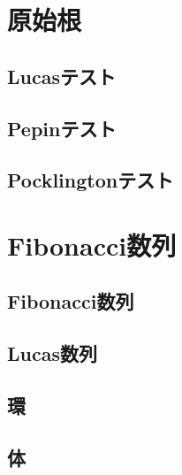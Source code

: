 \section{原始根}
\subsection{Lucasテスト}

\subsection{Pepinテスト}

\subsection{Pocklingtonテスト}


\section{Fibonacci数列}
\subsection{Fibonacci数列}

\subsection{Lucas数列}

\subsection{環}

\subsection{体}


\newpage
\printindex




